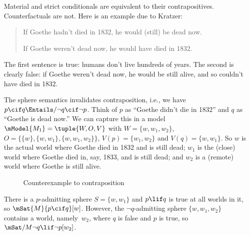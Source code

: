 \documentclass[../../../include/open-logic-section]{subfiles}
\begin{document}


Material and strict conditionals are equivalent to their
contrapositives. Counterfactuals are not.  Here is an example due to
Kratzer:
\begin{quote}
  If Goethe hadn't died in 1832, he would (still) be dead now.

  If Goethe weren't dead now, he would have died in 1832.
\end{quote}
The first sentence is true: humans don't live hundreds of years.  The
second is clearly false: if Goethe weren't dead now, he would be still
alive, and so couldn't have died in 1832.

\begin{ex}
  The sphere semantics invalidates contraposition, i.e., we have $p
  \cif q \Entails/ \lnot q \cif \lnot p$. Think of $p$ as ``Goethe
  didn't die in 1832'' and $q$ as ``Goethe is dead now.'' We can
  capture this in a model $\mModel{M_1} = \tuple{W, O, V}$ with $W =
  \{w, w_1, w_2\}$, $O = \{\{w\}, \{w, w_1\}, \{w, w_1, w_2\}\}$,
  $V(p) = \{w_1, w_2\}$ and $V(q) = \{w, w_1\}$. So $w$ is the actual
  world where Goethe died in 1832 and is still dead; $w_1$ is the
  (close) world where Goethe died in, say, 1833, and is still dead;
  and $w_2$ is a (remote) world where Goethe is still alive.
\begin{figure}
\begin{center}
\caption{Counterexample to contraposition}
\end{center}
\end{figure}
There is a $p$-admitting sphere $S =
\{w, w_1\}$ and $p \lif q$ is true at all worlds in it, so $\mSat{M}{p
  \cif q}[w]$. However, the $\lnot q$-admitting sphere $\{w, w_1,
w_2\}$ contains a world, namely~$w_2$, where $q$ is false and $p$ is
true, so $\mSat/{M}{\lnot q \lif \lnot p}[w_2]$.
\end{ex}
\end{document}
